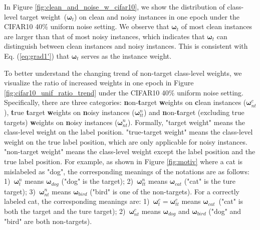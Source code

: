 In Figure \ref{fig:clean_and_noise_w_cifar10}, we show the distribution of class-level target weight~($\boldsymbol\omega_t$) on clean and noisy instances in one epoch under the CIFAR10 40\% uniform noise setting.
%
We observe that $\boldsymbol\omega_t$ of most clean instances are larger than that of most noisy instances, which indicates that $\boldsymbol\omega_t$ can distinguish between clean instances and noisy instances.
%
This is consistent with Eq. (\ref{eq:grad1'})  that $\boldsymbol\omega_t$ serves as the instance weight. 

To better understand the changing trend of non-target class-level weights, we visualize the ratio of increased weights in one epoch in Figure \ref{fig:cifar10_unif_ratio_trend} under the CIFAR10 40\% uniform noise setting.
%
Specifically, there are three categories: \textbf{n}on-\textbf{t}arget \textbf{w}eights on \textbf{c}lean instances (\textbf{$\boldsymbol\omega^c_{nt}$}), \textbf{t}rue \textbf{t}arget \textbf{w}eights on \textbf{n}oisy instances (\textbf{$\boldsymbol\omega^{n}_{tt}$}) and \textbf{n}on-\textbf{t}arget (excluding true targets) \textbf{w}eights on \textbf{n}oisy instances ($\boldsymbol\omega^n_{nt}$).
%
Formally, "target weight" means the class-level weight on the label position.
%
"true-target weight" means the class-level weight on the true label position, which are only applicable for noisy instances. "non-target weight" means the class-level weight except the label position and the true label position.
%
For example, as shown in Figure \ref{fig:motiv} where a cat is mislabeled as "dog", the corresponding meanings of the notations are as follows: 1)~$\boldsymbol\omega^n_{t}$ means $\boldsymbol\omega_{dog}$ ("dog" is the target); 2)~$\boldsymbol\omega^n_{tt}$ means $\boldsymbol\omega_{cat}$ ("cat" is the ture target); 3)~$\boldsymbol\omega^n_{nt}$ means $\boldsymbol\omega_{bird}$ ("bird" is one of the non-targets).
%
For a correctly labeled cat, the corresponding meanings are: 1)~$\boldsymbol\omega^c_{t}=\boldsymbol\omega^c_{tt}$ means $\boldsymbol\omega_{cat}$~("cat" is both the target and the ture target); 2)~$\boldsymbol\omega^c_{nt}$ means $\boldsymbol\omega_{dog}$ and $\boldsymbol\omega_{bird}$ ("dog" and "bird" are both non-targets).


